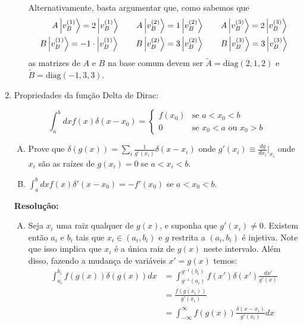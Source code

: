 \documentclass[a4paper, 12pt, notitlepage]{article}
\begin{document}
\begin{enumerate}
\begin{enumerate}[(A)]
  Alternativamente, basta argumentar que, como sabemos que
  \begin{align*}
  A\ket{v_B^{(1)}} = 2\ket{v_B^{(1)}} \qquad A\ket{v_B^{(2)}} &= 1\ket{v_B^{(2)}} \qquad A\ket{v_B^{(3)}} = 2\ket{v_B^{(3)}} \\
  B\ket{v_B^{(1)}} = -1\cdot\ket{v_B^{(1)}} \qquad B\ket{v_B^{(2)}} &= 3\ket{v_B^{(2)}} \qquad B\ket{v_B^{(3)}} = 3\ket{v_B^{(3)}}
  \end{align*}
  \noindent as matrizes de $A$ e $B$ na base comum devem ser $\tilde{A} = \text{diag}(2, 1, 2)$ e $\tilde{B} = \text{diag}(-1, 3, 3)$.
  
\end{enumerate}

\item Propriedades da função Delta de Dirac:

\begin{equation*}
  \int_a^b dx f(x)\delta(x - x_0) = \begin{cases}
    f(x_0)&\text{se }a < x_0 < b \\
    0 & \text{se }x_0 < a \text{ ou }x_0 > b
    \end{cases}
\end{equation*}

\begin{enumerate}[(A)]
  \item Prove que $\delta(g(x)) = \sum_i \frac{1}{g'(x_i)}\delta(x - x_i)$ onde $g'(x_i) \equiv \frac{dg}{dx_i}\Big|_{x_i}$ onde $x_i$ são as raízes de $g(x_i) = 0$ se $a < x_i < b$.
  \item $\int_a^b dx f(x)\delta'(x - x_0) = -f'(x_0)$ se $a < x_0 < b$.
  
\end{enumerate}

\textbf{Resolução: }
\begin{enumerate}[(A)]
  \item Seja $x_i$ uma raiz qualquer de $g(x)$, e suponha que $g'(x_i) \neq 0 $. Existem então $a_i$ e $b_i$ tais que $x_i \in (a_i, b_i)$ e $g$ restrita a $(a_i, b_i)$ é injetiva. Note que isso implica que $x_i$ é a única raiz de $g(x)$ neste intervalo. Além disso, fazendo a mudança de variáveis $x' = g(x)$ temos:
  \begin{align*}
  \int_{a_i}^{b_i} f(g(x))\delta(g(x)) dx &= \int_{g^{-1}(a_i)}^{g^{-1}(b_i)} f(x') \delta(x') \frac{dx'}{g'(x)} \\
  &= \frac{f(g(x_i))}{g'(x_i)} \\
  &= \int_{-\infty}^{\infty} f(g(x)) \frac{\delta(x-x_i)}{g'(x_i)} dx
  \end{align*}
  

\end{enumerate}
\end{enumerate}
\end{document}
